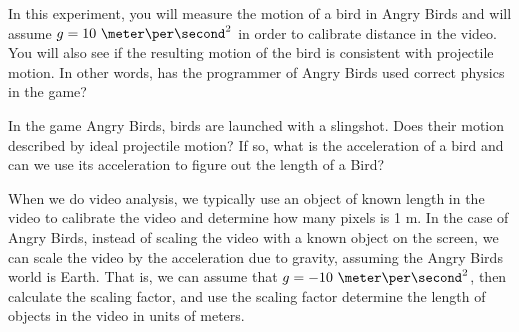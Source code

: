 
\apparatus


\longgoal

In this experiment, you will measure the motion of a bird in Angry Birds and will assume $g=10\ \meter\per\second^2$ in order to calibrate distance in the video. You will also see if the resulting motion of the bird is consistent with projectile motion. In other words, has the programmer of Angry Birds used correct physics in the game?

\introduction

In the game Angry Birds, birds are launched with a slingshot. Does their motion described by ideal projectile motion? If so, what is the acceleration of a bird and can we use its acceleration to figure out the length of a Bird? 

When we do video analysis, we typically use an object of known length in the video to calibrate the video and determine how many pixels is 1 m. In the case of Angry Birds, instead of scaling the video with a known object on the screen, we can scale the video by the acceleration due to gravity, assuming the Angry Birds world is Earth. That is, we can assume that $g=-10\ \meter\per\second^2$, then calculate the scaling factor, and use the scaling factor determine the length of objects in the video in units of meters.

\procedure


